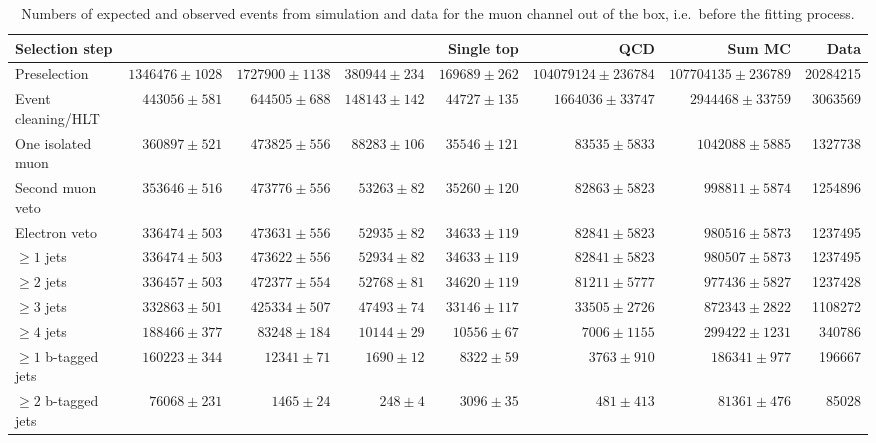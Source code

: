 \begin{table}
  \centering
   \caption{Numbers of expected and observed events from simulation and data
   for the muon channel out of the box, i.e.\ before the fitting process.}
    \label{tab:event_yields_mujets}
    \resizebox{\columnwidth}{!} {
    \begin{tabular}{lrrrrrrr}
    \toprule
	\textbf{Selection step} & \textbf{\ttjets} & \textbf{\WpJets} & \textbf{\ZpJets} & \textbf{Single top} & \textbf{QCD} & \textbf{Sum MC} & \textbf{Data} \\
	\midrule
	Preselection  &  $1346476 \pm 1028$ &  $1727900 \pm 1138$ &  $380944 \pm 234$ &  $169689 \pm 262$ &  $104079124 \pm 236784$ &  $107704135 \pm 236789$ &  20284215 \\ 
	Event cleaning/HLT  &  $443056 \pm 581$ &  $644505 \pm 688$ &  $148143 \pm 142$ &  $44727 \pm 135$ &  $1664036 \pm 33747$ &  $2944468 \pm 33759$ &  3063569 \\ 
	One isolated muon  &  $360897 \pm 521$ &  $473825 \pm 556$ &  $88283 \pm 106$ &  $35546 \pm 121$ &  $83535 \pm 5833$ &  $1042088 \pm 5885$ &  1327738 \\ 
	Second muon veto  &  $353646 \pm 516$ &  $473776 \pm 556$ &  $53263 \pm 82$ &  $35260 \pm 120$ &  $82863 \pm 5823$ &  $998811 \pm 5874$ &  1254896 \\ 
	Electron veto  &  $336474 \pm 503$ &  $473631 \pm 556$ &  $52935 \pm 82$ &  $34633 \pm 119$ &  $82841 \pm 5823$ &  $980516 \pm 5873$ &  1237495 \\ 
	$\geq 1$ jets  &  $336474 \pm 503$ &  $473622 \pm 556$ &  $52934 \pm 82$ &  $34633 \pm 119$ &  $82841 \pm 5823$ &  $980507 \pm 5873$ &  1237495 \\ 
	$\geq 2$ jets  &  $336457 \pm 503$ &  $472377 \pm 554$ &  $52768 \pm 81$ &  $34620 \pm 119$ &  $81211 \pm 5777$ &  $977436 \pm 5827$ &  1237428 \\ 
	$\geq 3$ jets  &  $332863 \pm 501$ &  $425334 \pm 507$ &  $47493 \pm 74$ &  $33146 \pm 117$ &  $33505 \pm 2726$ &  $872343 \pm 2822$ &  1108272 \\ 
	$\geq 4$ jets  &  $188466 \pm 377$ &  $83248 \pm 184$ &  $10144 \pm 29$ &  $10556 \pm 67$ &  $7006 \pm 1155$ &  $299422 \pm 1231$ &  340786 \\ 
	$\geq 1$ b-tagged jets  &  $160223 \pm 344$ &  $12341 \pm 71$ &  $1690 \pm 12$ &  $8322 \pm 59$ &  $3763 \pm 910$ &  $186341 \pm 977$ &  196667 \\ 
	$\geq 2$ b-tagged jets  &  $76068 \pm 231$ &  $1465 \pm 24$ &  $248 \pm 4$ &  $3096 \pm 35$ &  $481 \pm 413$ &  $81361 \pm 476$ &  85028 \\ 
	\bottomrule
	\end{tabular}
	}
\end{table}

